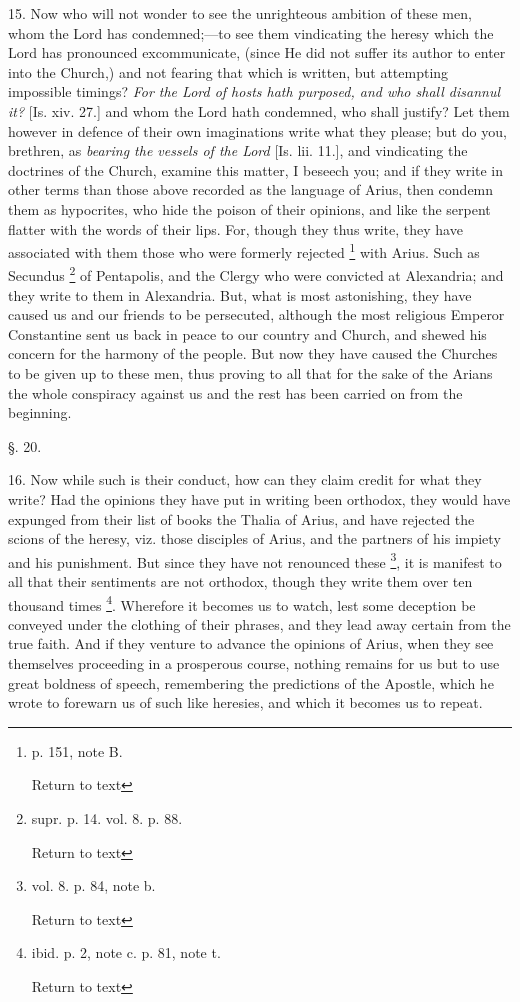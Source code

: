 15. Now who will not wonder to see the
unrighteous ambition of these men, whom the Lord has condemned;—to
see them vindicating the heresy which the Lord has pronounced
excommunicate, (since He did not suffer its author to enter into the
Church,) and not fearing that which is written, but attempting
impossible timings? \emph{For the Lord of hosts hath purposed, and who
shall disannul it?} [Is. xiv. 27.] and whom the Lord hath
condemned, who shall justify? Let them however in defence of their own
imaginations write what they please; but do you, brethren, as \emph{bearing
the vessels of the Lord} [Is. lii. 11.], and vindicating the
doctrines of the Church, examine this matter, I beseech you; and if
they write in other terms than those above recorded as the language of
Arius, then condemn them as hypocrites, who hide the poison of their
opinions, and like the serpent flatter with the words of their lips.
For, though they thus write, they have associated with them those who
were formerly rejected \footnote{p. 151, note B.

Return to text} with Arius.
Such as Secundus \footnote{supr. p. 14. vol. 8. p. 88.

Return to text} of Pentapolis, and
the Clergy who were convicted at Alexandria; and they write to them in
Alexandria. But, what is most astonishing, they have caused us and our
friends to be persecuted, although the most religious Emperor
Constantine sent us back in peace to our country and Church, and
shewed his concern for the harmony of the people. But now they have
caused the Churches to be given up to these men, thus proving to all
that for the sake of the Arians the whole conspiracy against us and
the rest has been carried on from the beginning.

§. 20.

16. Now while such is their conduct, how can they
claim credit for what they write? Had the opinions they have put in
writing been orthodox, they would have expunged from their list of
books the Thalia of Arius, and have rejected the scions of the heresy,
viz. those disciples of Arius, and the partners of his impiety and his
punishment. But since they have not renounced these \footnote{vol. 8. p. 84, note b.

Return to text}, it is manifest to all that their sentiments are not orthodox,
though they write them over ten thousand times \footnote{ibid. p. 2, note c. p. 81, note t.

Return to text}. Wherefore it becomes us to watch, lest some deception be conveyed
under the clothing of their phrases, and they lead away certain from
the true faith. And if they venture to advance the opinions of Arius,
when they see themselves proceeding in a prosperous course, nothing
remains for us but to use great boldness of speech, remembering the
predictions of the Apostle, which he wrote to forewarn us of such like
heresies, and which it becomes us to repeat.

